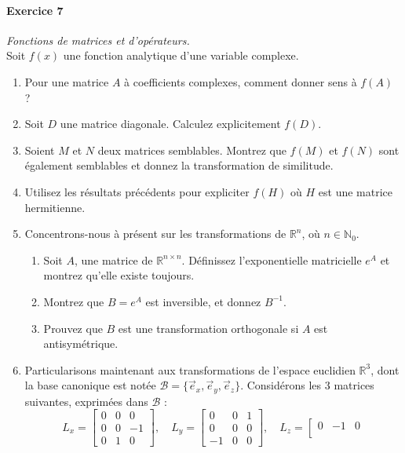 \paragraph{Exercice 7} \textit{Fonctions de matrices et d'opérateurs.} \\
Soit $f(x)$ une fonction analytique d'une variable complexe. 
\begin{enumerate}
\item Pour une matrice $A$ à coefficients complexes, comment donner sens à $f(A)$ ?
\item Soit $D$ une matrice diagonale. Calculez explicitement $f(D)$.
\item Soient $M$ et $N$ deux matrices semblables. Montrez que $f(M)$ et $f(N)$ sont également semblables et donnez la transformation de similitude.
\item Utilisez les résultats précédents pour expliciter $f(H)$ où $H$ est une matrice hermitienne.
\newpage
\item Concentrons-nous à présent sur les transformations de $\mathbb R^n$, où $n\in\mathbb N_0$. 
\begin{enumerate}
\item Soit $A$, une matrice de $\mathbb R^{n\times n}$. Définissez l'exponentielle matricielle $e^A$ et montrez qu'elle existe toujours.
\item Montrez que $B = e^A$ est inversible, et donnez $B^{-1}$.
\item Prouvez que $B$ est une transformation orthogonale si $A$ est antisymétrique.
\end{enumerate}
\item Particularisons maintenant aux transformations de l'espace euclidien $\mathbb R^3$, dont la base canonique est notée $\mathscr B = \lbrace \vec e_x,\vec e_y,\vec e_z \rbrace$. Considérons les 3 matrices suivantes, exprimées dans $\mathscr B$ :
\begin{equation}
L_x = \left[
\begin{array}{ccc}
0 & 0 & 0 \\ 
0 & 0 & -1 \\ 
0 & 1 & 0
\end{array} 
\right], \quad
L_y = \left[
\begin{array}{ccc}
0 & 0 & 1 \\ 
0 & 0 & 0 \\ 
-1 & 0 & 0
\end{array} 
\right], \quad
L_z = \left[
\begin{array}{ccc}
0 & -1 & 0 \\ 

\end{array}
\end{equation}
\end{enumerate}
